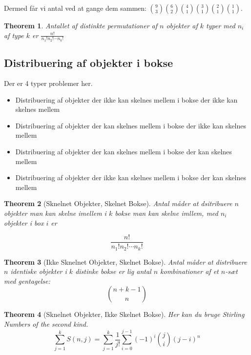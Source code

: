 \documentclass[11pt]{article}
\newtheorem{theorem}{Theorem}
\theoremstyle{definition}
\theoremstyle{remark}
\begin{document}
Dermed får vi antal ved at gange dem sammen: $\binom{9}{3} \binom{6}{2} \binom{4}{1} \binom{3}{1} \binom{2}{1} \binom{1}{1}$.

\begin{theorem}
Antallet af distinkte permutationer af $n$ objekter af $k$ typer med $n_{i}$ af type $k$ er $\frac{n!}{n_{1}!n_{2}!\cdots n_{k}!}$
\end{theorem}

\subsection{Distribuering af objekter i bokse}

Der er 4 typer problemer her.

\begin{itemize}
\item Distribuering af objekter der ikke kan skelnes mellem i bokse der ikke kan skelnes mellem
\item Distribuering af objekter der kan skelnes mellem i bokse der ikke kan skelnes mellem
\item Distribuering af objekter der kan skelnes mellem i bokse der kan skelnes mellem
\item Distribuering af objekter der ikke kan skelnes mellem i bokse der kan skelnes mellem
  \end{itemize}

\begin{theorem}[Sknelnet Objekter, Skelnet Bokse]
  Antal måder at dsitribuere $n$ objekter man kan skelne imellem i $k$ bokse man kan skelne imllem, med $n_{i}$ objekter i box $i$ er

  \[
\frac{n!}{n_{1}!n_{2}! \cdots n_{k}!}
  \]
\end{theorem}


\begin{theorem}[Ikke Sknelnet Objekter, Skelnet Bokse]
  Antal måder at distribuere $n$ identiske objekter i $k$ distinke bokse er lig antal $n$ kombinationer af et $n$-sæt med gentagelse:
  \[
\binom{n+k-1}{n}
  \]
\end{theorem}


\begin{theorem}[Sknelnet Objekter, Ikke Skelnet Bokse]
Her kan du bruge Stirling Numbers of the second kind.
\[

  \sum_{j=1}^{k}S(n,j) = \sum_{j=1}^{k}\frac{1}{j!} \sum_{i=0}^{j-1}(-1)^{i} \binom{j}{i} (j-i)^{n}
  \]
\end{theorem}
\end{document}
